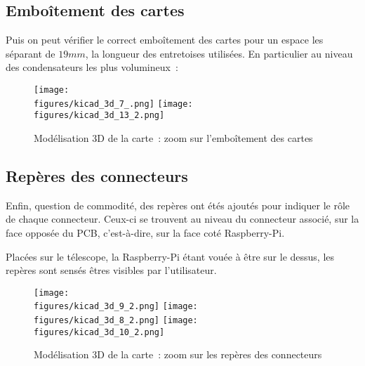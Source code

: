 \subsection{Emboîtement des cartes}

Puis on peut vérifier le correct emboîtement des cartes pour un espace les séparant de $19mm$, la longueur des entretoises utilisées. En particulier au niveau des condensateurs les plus volumineux~:

\begin{figure}[H]
    \centering
    \texttt{[image: \\figures/kicad\_3d\_7\_.png]}
    \texttt{[image: \\figures/kicad\_3d\_13\_2.png]}
    \decoRule
    \caption[
    Modélisation 3D de la carte~: zoom sur l'emboîtement des cartes]{
    Modélisation 3D de la carte~: zoom sur l'emboîtement des cartes}
    \label{fig:Modélisation 3D de la carte : zoom sur l'emboîtement des cartes}
    \end{figure}

\subsection{Repères des connecteurs}

Enfin, question de commodité, des repères ont étés ajoutés pour indiquer le rôle de chaque connecteur. Ceux-ci se trouvent au niveau du connecteur associé, sur la face opposée du PCB, c'est-à-dire, sur la face coté Raspberry-Pi.

Placées sur le télescope, la Raspberry-Pi étant vouée à être sur le dessus, les repères sont sensés êtres visibles par l'utilisateur.

\begin{figure}[H]
    \centering
    \texttt{[image: \\figures/kicad\_3d\_9\_2.png]}
    \texttt{[image: \\figures/kicad\_3d\_8\_2.png]}
    \texttt{[image: \\figures/kicad\_3d\_10\_2.png]}
    \decoRule
    \caption[
    Modélisation 3D de la carte~: zoom sur les repères des connecteurs]{
    Modélisation 3D de la carte~: zoom sur les repères des connecteurs}
    \label{fig:Modélisation 3D de la carte : zoom sur les repères des connecteurs}
    \end{figure}

\vspace{1cm}

